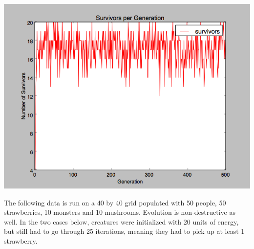 \documentclass{article}
\begin{document}
\includegraphics[width=1\textwidth]{15survivors}

The following data is run on a 40 by 40 grid populated with 50 people, 50 strawberries, 10 monsters and 10 mushrooms.  Evolution is non-destructive as well.  In the two cases below, creatures were initialized with 20 units of energy, but still had to go through 25 iterations, meaning they had to pick up at least 1 strawberry.
\end{document}

